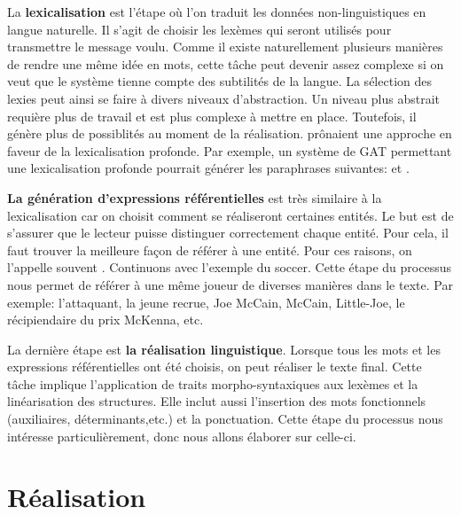 La \textbf{lexicalisation} est l'étape où l'on traduit les données non-linguistiques en langue naturelle. Il s'agit de choisir les lexèmes qui seront utilisés pour transmettre le message voulu. Comme il existe naturellement plusieurs manières de rendre une même idée en mots, cette tâche peut devenir assez complexe si on veut que le système tienne compte des subtilités de la langue. La sélection des lexies peut ainsi se faire à divers niveaux d'abstraction. Un niveau plus abstrait requière plus de travail et est plus complexe à mettre en place. Toutefois, il génère plus de possiblités au moment de la réalisation. \cite{ElhadadFloatingConstraintsLexical1997} prônaient une approche en faveur de la lexicalisation profonde. Par exemple, un système de \ac{GAT} permettant une lexicalisation profonde pourrait générer les paraphrases suivantes:  et .

\textbf{La génération d'expressions référentielles} est très similaire à la lexicalisation car on choisit comment se réaliseront certaines entités. Le but est de s'assurer que le lecteur puisse distinguer correctement chaque entité. Pour cela, il faut trouver la meilleure façon de référer à une entité. Pour ces raisons, on l'appelle souvent . Continuons avec l'exemple du soccer. Cette étape du processus nous permet de référer à une même joueur de diverses manières dans le texte. Par exemple: l'attaquant, la jeune recrue, Joe McCain, McCain, Little-Joe, le récipiendaire du prix McKenna, etc.

La dernière étape est \textbf{la réalisation linguistique}. Lorsque tous les mots et les expressions référentielles ont été choisis, on peut réaliser le texte final. Cette tâche implique l'application de traits morpho-syntaxiques aux lexèmes et la linéarisation des structures. Elle inclut aussi l'insertion des mots fonctionnels (auxiliaires, déterminants,etc.) et la ponctuation. Cette étape du processus nous intéresse particulièrement, donc nous allons élaborer sur celle-ci.





\section{Réalisation}

